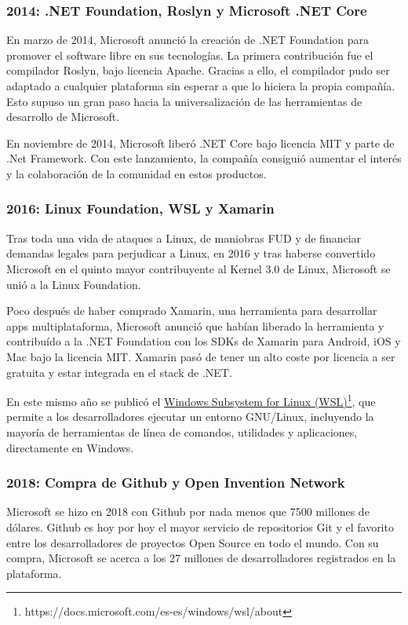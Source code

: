 \subsubsection{2014: .NET Foundation, Roslyn y Microsoft .NET Core}
En marzo de 2014, Microsoft anunció la creación de .NET Foundation para promover el software libre en sus tecnologías. La primera contribución fue el compilador Roslyn, bajo licencia Apache. Gracias a ello, el compilador pudo ser adaptado a cualquier plataforma sin esperar a que lo hiciera la propia compañía. Esto supuso un gran paso hacia la universalización de las herramientas de desarrollo de Microsoft.\cite{xatakaw_2014:net_foundation}

En noviembre de 2014, Microsoft liberó .NET Core bajo licencia MIT y parte de .Net Framework. Con este lanzamiento, la compañía consiguió aumentar el interés y la colaboración de la comunidad en estos productos.\cite{arstechnica_2014:microsoft_open_sources_.NET}

\subsubsection{2016: Linux Foundation, WSL y Xamarin}
Tras toda una vida de ataques a Linux, de maniobras FUD y de financiar demandas legales para perjudicar a Linux, en 2016 y tras haberse convertido Microsoft en el quinto mayor contribuyente al Kernel 3.0 de Linux\cite{zdnet_2011:microsoft_contributes_linux}, Microsoft se unió a la Linux Foundation.\cite{arstechnica_2016:microsoft_joins_linux_foundation}

Poco después de haber comprado Xamarin, una herramienta para desarrollar apps multiplataforma, Microsoft anunció que habían liberado la herramienta y contribuído a la .NET Foundation con los SDKs de Xamarin para Android, iOS y Mac bajo la licencia MIT. Xamarin pasó de tener un alto coste por licencia a ser gratuita y estar integrada en el stack de .NET. \cite{genbeta_2016:microsoft_xamarin} \cite{petri_2016:microsoft_xamarin}

En este mismo año se publicó el \href{https://docs.microsoft.com/es-es/windows/wsl/about}{Windows Subsystem for Linux (WSL)}\footnote{https://docs.microsoft.com/es-es/windows/wsl/about}, que permite a los desarrolladores ejecutar un entorno GNU/Linux, incluyendo la mayoría de herramientas de línea de comandos, utilidades y aplicaciones, directamente en Windows.

\subsubsection{2018: Compra de Github y Open Invention Network}
Microsoft se hizo en 2018 con Github por nada menos que 7500 millones de dólares. Github es hoy por hoy el mayor servicio de repositorios Git y el favorito entre los desarrolladores de proyectos Open Source en todo el mundo. Con su compra, Microsoft se acerca a los 27 millones de desarrolladores registrados en la plataforma. \cite{xataca_2018:microsoft_gighub}

